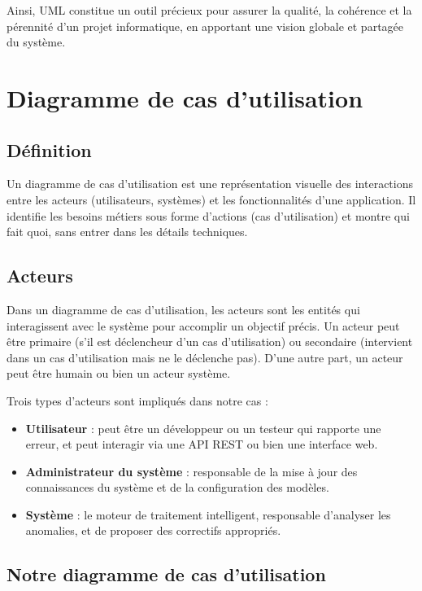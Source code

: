 \documentclass[12pt,a4paper]{report}
\begin{document}
	Ainsi, UML constitue un outil précieux pour assurer la qualité, la cohérence et la pérennité d’un projet informatique, en apportant une vision globale et partagée du système.
	
	\section{Diagramme de cas d'utilisation}
	
	\subsection{Définition}
	
	Un diagramme de cas d'utilisation est une représentation visuelle des interactions entre les acteurs (utilisateurs, systèmes) et les fonctionnalités d'une application. Il identifie les besoins métiers sous forme d'actions (cas d’utilisation) et montre qui fait quoi, sans entrer dans les détails techniques.
	
	\subsection{Acteurs}
	
	Dans un diagramme de cas d'utilisation, les acteurs sont les entités qui interagissent avec le système pour accomplir un objectif précis. Un acteur peut être primaire (s'il est déclencheur d'un cas d'utilisation) ou secondaire (intervient dans un cas d'utilisation mais ne le déclenche pas). D'une autre part, un acteur peut être humain ou bien un acteur système.
	
	Trois types d'acteurs sont impliqués dans notre cas :
	
	\begin{itemize}
		\item \textbf{Utilisateur} : peut être un développeur ou un testeur qui rapporte une erreur, et peut interagir via une API REST ou bien une interface web.
		
		\item \textbf{Administrateur du système} : responsable de la mise à jour des connaissances du système et de la configuration des modèles.
		
		\item \textbf{Système} : le moteur de traitement intelligent, responsable d'analyser les anomalies, et de proposer des correctifs appropriés.
	\end{itemize}
	
	\subsection{Notre diagramme de cas d'utilisation}
	
\end{document}
